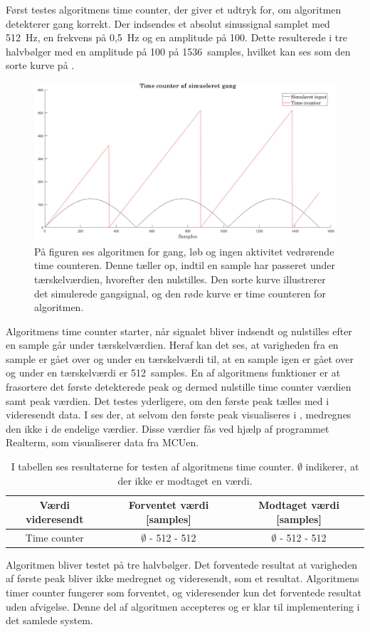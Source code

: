 Først testes algoritmens time counter, der giver et udtryk for, om algoritmen detekterer gang korrekt. Der indsendes et absolut sinussignal samplet med 512~Hz, en frekvens på 0,5~Hz og en amplitude på 100. Dette resulterede i tre halvbølger med en amplitude på 100 på 1536~samples, hvilket kan ses som den sorte kurve på .
\begin{figure}[H]
	\centering
	\includegraphics[width=.7\textwidth]{figures/cDesign/test_timecount_gang.png}
	\caption{På figuren ses algoritmen for gang, løb og ingen aktivitet vedrørende time counteren. Denne tæller op, indtil en sample har passeret under tærskelværdien, hvorefter den nulstilles. Den sorte kurve illustrerer det simulerede gangsignal, og den røde kurve er time counteren for algoritmen.}
	\label{fig:testgraf_timecounter}
\end{figure}\vspace{-0.25cm}
Algoritmens time counter starter, når signalet bliver indsendt og nulstilles efter en sample går under tærskelværdien. Heraf kan det ses, at varigheden fra en sample er gået over og under en tærskelværdi til, at en sample igen er gået over og under en tærskelværdi er 512~samples. En af algoritmens funktioner er at frasortere det første detekterede peak og dermed nulstille time counter værdien samt peak værdien. Det testes yderligere, om den første peak tælles med i videresendt data. I  ses der, at selvom den første peak visualiseres i , medregnes den ikke i de endelige værdier. Disse værdier fås ved hjælp af programmet Realterm, som visualiserer data fra MCUen.
\begin{table}[H]
	\centering
	\begin{tabular}{ccc}
		\hline
		\rowcolor[HTML]{C0C0C0} 
		Værdi videresendt & Forventet værdi [samples] & Modtaget værdi [samples] \\ \hline
		Time counter & $\emptyset$ - 512 - 512 & $\emptyset$ - 512 - 512 \\ \hline
	\end{tabular}
	\caption{I tabellen ses resultaterne for testen af algoritmens time counter. $\emptyset$ indikerer, at der ikke er modtaget en værdi.}
	\label{tab:test_res_timecount}
\end{table}\vspace{-0.25cm}
Algoritmen bliver testet på tre halvbølger. Det forventede resultat at varigheden af første peak bliver ikke medregnet og videresendt, som et resultat. Algoritmens timer counter fungerer som forventet, og videresender kun det forventede resultat uden afvigelse. Denne del af algoritmen accepteres og er klar til implementering i det samlede system.

